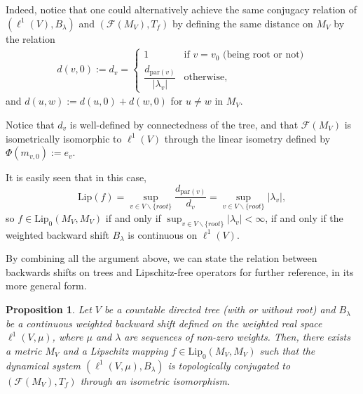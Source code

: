 \documentclass[12pt,english]{amsart}
\numberwithin{equation}{section}
\theoremstyle{plain}
\newtheorem{proposition}[theorem]{Proposition}
\theoremstyle{definition}
\def\pare{\text{par}}
\newcommand{\free}[1]{\mathcal{F}(#1)}
\def\lip{ \text{Lip}}
\begin{document}
Indeed, notice that one could alternatively achieve the same  conjugacy relation of $(\ell^1(V), B_\lambda)$ and $(\free{M_V}, T_f)$ by defining the same distance on $M_V$ by the relation
\begin{align*}
    d(v,0):=d_v=\begin{cases} 
      1 & \text{if $v=v_0$ (being root or not)} \\
      \dfrac{d_{\pare(v)}}{|\lambda_v|} & \text{otherwise,}
   \end{cases}
\end{align*}
and $d(u,w):= d(u,0)+d(w,0)$ for $u\neq w$ in $M_V$.

Notice that $d_v$ is well-defined by connectedness of the tree, and that $\free{M_V}$ is isometrically isomorphic to $ \ell^1(V)$ through the linear isometry defined by $\Phi(m_{v,0}):=e_v$. 

It is easily seen that in this case,
\[\lip(f)=\sup_{v\in V\backslash\{root\}} \dfrac{d_{\pare(v)}}{d_v}= \sup_{v\in V\backslash\{root\}} |\lambda_v|,\]
so $f\in \lip_0(M_V,M_V)$ if and only if $\sup_{v\in V\backslash\{root\}}|\lambda_v|<\infty$, if and only if the weighted backward shift $B_\lambda$ is continuous on $\ell^1(V)$. 


By combining all the argument above, we can state the relation between backwards shifts on trees and Lipschitz-free operators for further reference, in its more general form.

\begin{proposition}\label{prop:backward-Tf}
    Let $V$ be a countable directed tree (with or without root) and $B_\lambda$ be a continuous weighted backward shift defined on the weighted real space $\ell^1(V,\mu)$, where $\mu$ and $\lambda$ are sequences of non-zero weights. Then, there exists a metric $M_V$ and a Lipschitz mapping $f\in\lip_0(M_V,M_V)$ such that the dynamical system $(\ell^1(V,\mu),B_{\lambda})$ is topologically conjugated to $(\free{M_V},T_f)$ through an isometric isomorphism. 
\end{proposition}
\end{document}
